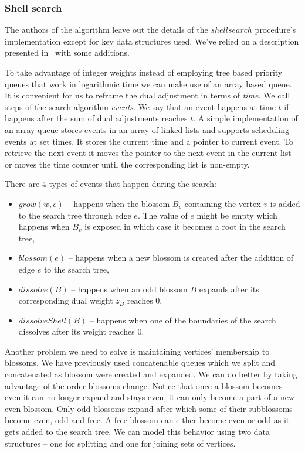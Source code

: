 \subsubsection{Shell search}

The authors of the algorithm leave out the details of the $shellsearch$ procedure's implementation except for key data structures used. We've relied on a description presented in~\cite{duan2018scaling} with some additions.

To take advantage of integer weights instead of employing tree based priority queues that work in logarithmic time we can make use of an array based queue. It is convenient for us to reframe the dual adjustment in terms of \textit{time}. We call steps of the search algorithm \textit{events}. We say that an event happens at time $t$ if happens after the sum of dual adjustments reaches $t$. A simple implementation of an array queue stores events in an array of linked lists and supports scheduling events at set times. It stores the current time and a pointer to current event. To retrieve the next event it moves the pointer to the next event in the current list or moves the time counter until the corresponding list is non-empty.

There are 4 types of events that happen during the search:

\begin{itemize}
    \item $grow(w, e)$ – happens when the blossom $B_v$ containing the vertex $v$ is added to the search tree through edge $e$. The value of $e$ might be empty which happens when $B_v$ is exposed in which case it becomes a root in the search tree,
    \item $blossom(e)$ – happens when a new blossom is created after the addition of edge $e$ to the search tree,
    \item $dissolve(B)$ – happens when an odd blossom $B$ expands after its corresponding dual weight $z_B$ reaches $0$,
    \item $dissolveShell(B)$ – happens when one of the boundaries of the search dissolves after its weight reaches $0$. 
\end{itemize}

Another problem we need to solve is maintaining vertices' membership to blossoms. We have previously used concatenable queues which we split and concatenated as blossom were created and expanded. We can do better by taking advantage of the order blossoms change. Notice that once a blossom becomes even it can no longer expand and stays even, it can only become a part of a new even blossom. Only odd blossoms expand after which some of their subblossoms become even, odd and free. A free blossom can either become even or odd as it gets added to the search tree. We can model this behavior using two data structures – one for splitting and one for joining sets of vertices.

